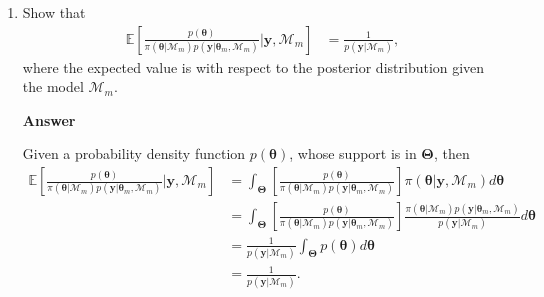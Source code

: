 \begin{enumerate}[leftmargin=*]
\item Show that 
\begin{align*}
	\mathbb{E}\left[\frac{p(\bm{\theta})}{\pi(\bm{\theta}|\mathcal{M}_m)p(\bm{y}|\bm{\theta}_m,\mathcal{M}_m)}\biggr\rvert \bm{y},\mathcal{M}_m\right]&=\frac{1}{p(\bm{y}|\mathcal{M}_m)},
\end{align*}
where the expected value is with respect to the posterior distribution given the model $\mathcal{M}_m$.

\textbf{Answer}

Given a probability density function $p(\bm{\theta})$, whose support is in $\bm{\Theta}$, then
{\footnotesize
\begin{align*}
	\mathbb{E}\left[\frac{p(\bm{\theta})}{\pi(\bm{\theta}|\mathcal{M}_m)p(\bm{y}|\bm{\theta}_m,\mathcal{M}_m)}\biggr\rvert \bm{y},\mathcal{M}_m\right]&=\int_{\bm{\Theta}}\left[\frac{p(\bm{\theta})}{\pi(\bm{\theta}|\mathcal{M}_m)p(\bm{y}|\bm{\theta}_m,\mathcal{M}_m)}\right]\pi(\bm{\theta}|\bm{y},\mathcal{M}_m)d\bm{\theta}\\
	&=\int_{\bm{\Theta}}\left[\frac{p(\bm{\theta})}{\pi(\bm{\theta}|\mathcal{M}_m)p(\bm{y}|\bm{\theta}_m,\mathcal{M}_m)}\right]\frac{\pi(\bm{\theta}|\mathcal{M}_m)p(\bm{y}|\bm{\theta}_m,\mathcal{M}_m)}{p(\bm{y}|\mathcal{M}_m)}d\bm{\theta}\\
	&=\frac{1}{p(\bm{y}|\mathcal{M}_m)}\int_{\bm{\Theta}}p(\bm{\theta})d\bm{\theta}\\
	&=\frac{1}{p(\bm{y}|\mathcal{M}_m)}.
\end{align*}
}
	
\end{enumerate}
